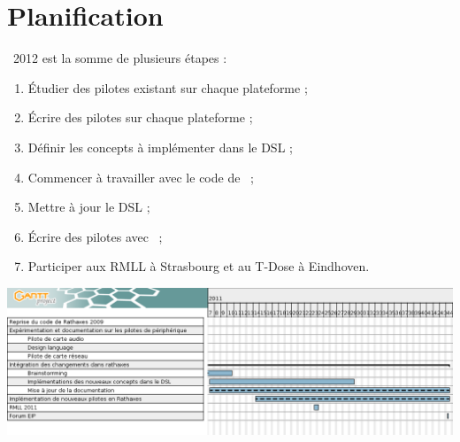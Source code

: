 \documentclass[chapterprefix=off]{rtxreport}
\begin{document}
\section{Planification}

\rtx\ 2012 est la somme de plusieurs étapes :

\begin{enumerate}
\item Étudier des pilotes existant sur chaque plateforme ;
\item Écrire des pilotes sur chaque plateforme ;
\item Définir les concepts à implémenter dans le DSL ;
\item Commencer à travailler avec le code de \rtx\ ;
\item Mettre à jour le DSL ;
\item Écrire des pilotes avec \rtx\ ;
\item Participer aux RMLL à Strasbourg et au T-Dose à Eindhoven.
\end{enumerate}

\begin{landscape}
\begin{table}
\centering
{}
\includegraphics[scale=0.55]{../../gantt/ganttRathaxes_v2}
\end{table}
\end{landscape}

\rtxbibliography
\end{document}
